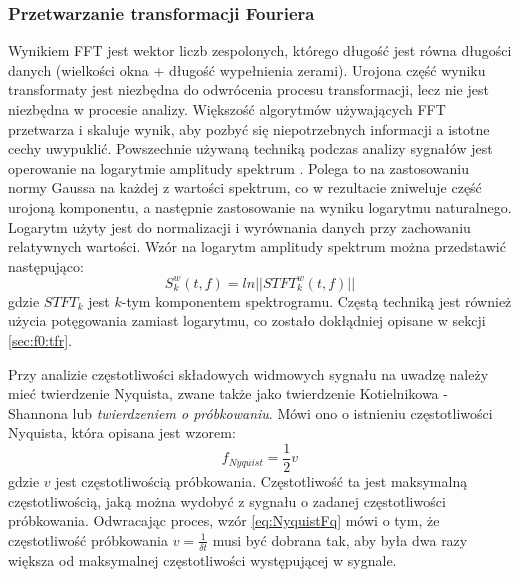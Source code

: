 \documentclass[12pt,a4paper,twoside]{mwart}
\begin{document}
\subsubsection{Przetwarzanie transformacji Fouriera}\label{sec:przetwarzanieFFT}
Wynikiem FFT jest wektor liczb zespolonych, którego długość jest równa długości danych (wielkości okna + długość wypełnienia zerami). Urojona część wyniku transformaty jest niezbędna do odwrócenia procesu transformacji, lecz nie jest niezbędna w procesie analizy. Większość algorytmów używających FFT przetwarza i skaluje wynik, aby pozbyć się niepotrzebnych informacji a istotne cechy uwypuklić. Powszechnie używaną techniką podczas analizy sygnałów jest operowanie na logarytmie amplitudy spektrum 
\cite[501-507]{Transcription:Talkin:RAPT}
. Polega to na zastosowaniu normy Gaussa na każdej z wartości spektrum, co w rezultacie zniweluje część urojoną komponentu, a następnie zastosowanie na wyniku logarytmu naturalnego. Logarytm użyty jest do normalizacji i wyrównania danych przy zachowaniu relatywnych wartości. Wzór na logarytm amplitudy spektrum można przedstawić następująco:
\begin{equation}\label{eq:logPowSpec}
S_k^w(t,f) = ln||STFT_k^w(t,f)||
\end{equation}
gdzie $STFT_k$ jest $k$-tym komponentem spektrogramu. Częstą techniką jest również użycia potęgowania zamiast logarytmu, co zostało dokłądniej opisane w sekcji \ref{sec:f0:tfr}.

Przy analizie częstotliwości składowych widmowych sygnału na uwadzę należy mieć twierdzenie Nyquista, zwane także jako twierdzenie Kotielnikowa - Shannona lub \textit{twierdzeniem o próbkowaniu}. Mówi ono o istnieniu częstotliwości Nyquista, która opisana jest wzorem:
\begin{equation} \label{eq:NyquistFq}
  f_{Nyquist} = \frac{1}{2}v
\end{equation}
gdzie $v$ jest częstotliwością próbkowania. Częstotliwość ta jest maksymalną częstotliwością, jaką można wydobyć z sygnału o zadanej częstotliwości próbkowania. Odwracając proces, wzór \ref{eq:NyquistFq} mówi o tym, że częstotliwość próbkowania $v = \frac{1}{\delta t}$ musi być dobrana tak, aby była dwa razy większa od maksymalnej częstotliwości występującej w sygnale.
\end{document}
